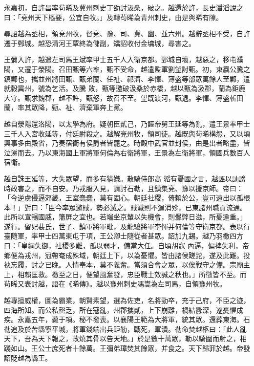 \begin{pinyinscope}
 永嘉初，自許昌率茍晞及冀州刺史丁劭討汲桑，破之。越還於許，長史潘滔說之曰：「兗州天下樞要，公宜自牧。」及轉茍晞為青州刺史，由是與晞有隙。



 尋詔越為丞相，領兗州牧，督兗、豫、司、冀、幽、並六州。越辭丞相不受，自許遷于鄄城。越恐清河王覃終為儲副，矯詔收付金墉城，尋害之。



 王彌入許，越遣左司馬王斌率甲士五千人入衛京都。鄄城自壞，越惡之，移屯濮陽，又遷于滎陽。召田甄等六率，甄不受命，越遣監軍劉望討甄。初，東嬴公騰之鎮鄴也，攜並州將田甄、甄弟蘭、任祉、祁濟、李惲、薄盛等部眾萬餘人至鄴，遣就穀冀州，號為乞活。及騰
 敗，甄等邀破汲桑於赤橋，越以甄為汲郡，蘭為鉅鹿大守。甄求魏郡，越不許，甄怒，故召不至。望既渡河，甄退。李惲、薄盛斬田蘭，率其眾降，甄、祉、濟棄軍奔上黨。



 越自滎陽還洛陽，以太學為府。疑朝臣貳己，乃誣帝舅王延等為亂，遣王景率甲士三千人入宮收延等，付廷尉殺之。越解兗州牧，領司徒。越既與茍晞構怨，又以頃興事多由殿省，乃奏宿衛有侯爵者皆罷之。時殿中武官並封侯，由是出者略盡，皆泣涕而去。乃以東海國上軍將軍何倫為右衛將軍，王景為左衛將軍，領國兵數百人宿衛。



 越自誅王延等，大失眾望，而多有猜嫌。散騎侍郎高
 韜有憂國之言，越誣以訕謗時政害之，而不自安。乃戎服入見，請討石勒，且鎮集兗、豫以援京師。帝曰：「今逆虜侵逼郊畿，王室蠢蠢，莫有固心。朝廷社稷，倚賴於公，豈可遠出以孤根本！」對曰：「臣今率眾邀賊，勢必滅之。賊滅則不逞消殄，已東諸州職貢流通。此所以宣暢國威，籓屏之宜也。若端坐京輦以失機會，則釁弊日滋，所憂逾重。」遂行。留妃裴氏，世子、鎮軍將軍毗，及龍驤將軍李惲并何倫等守衛京都。表以行臺隨軍，率甲士四萬東屯于項，王公卿士隨從者甚眾。詔加九錫。越乃羽檄四方曰：「皇綱失御，社稷多難，孤以弱才，備當大任。自頃胡寇
 內逼，偏裨失利，帝鄉便為戎州，冠帶奄成殊域，朝廷上下，以為憂懼。皆由諸侯蹉跎，遂及此難。投袂忘履，討之已晚。人情奉本，莫不義奮。當須合會之眾，以俟戰守之備。宗廟主上，相賴匡救。檄至之日，便望風奮發，忠臣戰士效誠之秋也。」所徵皆不至。而茍晞又表討越，語在《晞傳》。越以豫州刺史馮嵩為左司馬，自領豫州牧。



 越專擅威權，圖為霸業，朝賢素望，選為佐吏，名將勁卒，充于己府，不臣之迹，四海所知。而公私罄乏，所在寇亂，州郡攜貳，上下崩離，禍結釁深，遂憂懼成疾。永嘉五年，薨于項。秘不發喪。以襄陽王範為大將軍，統其眾。還葬東海。石
 勒追及於苦縣寧平城，將軍錢端出兵距勒，戰死，軍潰。勒命焚越柩曰：「此人亂天下，吾為天下報之，故燒其骨以告天地。」於是數十萬眾，勒以騎圍而射之，相踐如山。王公士庶死者十餘萬。王彌弟璋焚其餘眾，并食之。天下歸罪於越。帝發詔貶越為縣王。




\end{pinyinscope}
